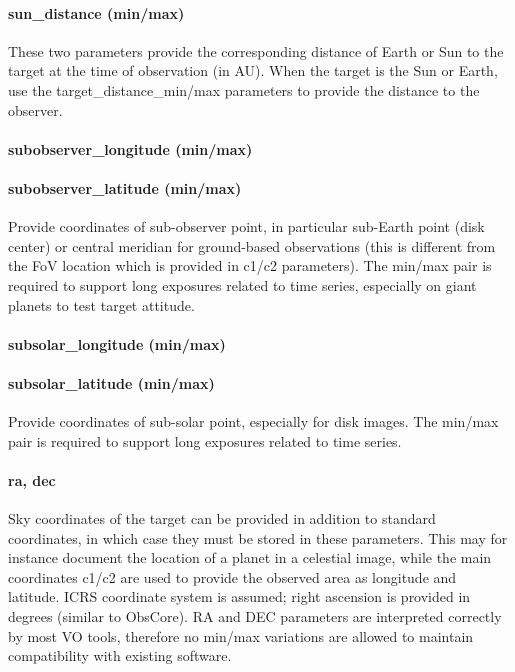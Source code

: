 \documentclass[11pt,a4paper]{ivoa}
\begin{document}
\paragraph{sun\_distance (min/max)}

These two parameters provide the corresponding distance of Earth or Sun
to the target at the time of observation (in AU). When the target is the
Sun or Earth, use the target\_distance\_min/max parameters to provide
the distance to the observer.

\paragraph{subobserver\_longitude (min/max)}

\paragraph{subobserver\_latitude (min/max)}

Provide coordinates of sub-observer point, in particular sub-Earth
point (disk center) or central meridian for ground-based observations
(this is different from the FoV location which is provided in c1/c2
parameters). The min/max pair is required to support long exposures
related to time series, especially on giant planets to test target
attitude.

\paragraph{subsolar\_longitude (min/max)}

\paragraph{subsolar\_latitude (min/max)}

Provide coordinates of sub-solar point, especially for disk images.
The min/max pair is required to support long exposures
related to time series.

\paragraph{ra, dec}

Sky coordinates of the target can be provided in addition to standard
coordinates, in which case they must be stored in these parameters.
This may for instance document the location of a planet
in a celestial image,
while the main coordinates c1/c2 are used to provide the observed area as
longitude and latitude. ICRS coordinate system is assumed; right ascension
is provided in degrees (similar to ObsCore). RA and DEC parameters are
interpreted correctly by most VO tools, therefore no min/max variations
are allowed to maintain compatibility with existing software.
\end{document}
